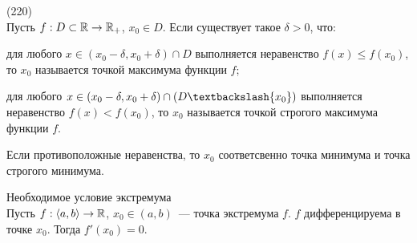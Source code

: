 (220)\\
Пусть $f: D \subset \mathbb{R} \to \mathbb{R}_+$, $x_0 \in D$. Если существует такое $\delta > 0$, что:

для любого $x \in (x_0 - \delta, x_0 + \delta) \cap D$ выполняется неравенство $f(x) \le f(x_0)$, то $x_0$ называется точкой максимума функции $f$;

для любого $x \in (x_0 - \delta, x_0 + \delta) \cap (D\bsl \{x_0\})$ выполняется неравенство $f(x) < f(x_0)$, то $x_0$ называется точкой строгого максимума функции $f$.

Если противоположные неравенства, то $x_0$ соответсвенно точка минимума и точка строгого минимума.

Необходимое условие экстремума\\
Пусть $f: \langle a, b\rangle \to \mathbb{R}$, $x_0\in (a, b)$~--- точка экстремума $f$. $f$ дифференцируема в точке $x_0$. Тогда $f'(x_0) = 0$.